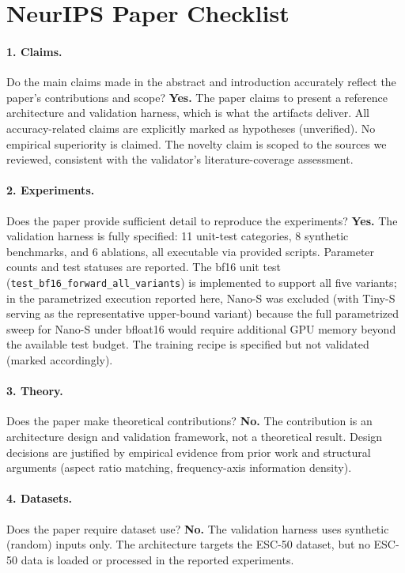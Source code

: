 \documentclass{article}
\begin{document}
\newpage
\section*{NeurIPS Paper Checklist}

\paragraph{1. Claims.}
Do the main claims made in the abstract and introduction accurately reflect the
paper's contributions and scope?
\textbf{Yes.} The paper claims to present a reference architecture and
validation harness, which is what the artifacts deliver. All accuracy-related
claims are explicitly marked as hypotheses (unverified). No empirical
superiority is claimed. The novelty claim is scoped to the sources we reviewed,
consistent with the validator's literature-coverage assessment.

\paragraph{2. Experiments.}
Does the paper provide sufficient detail to reproduce the experiments?
\textbf{Yes.} The validation harness is fully specified: 11 unit-test categories,
8 synthetic benchmarks, and 6 ablations, all executable via provided scripts.
Parameter counts and test statuses are reported. The bf16 unit test
(\texttt{test\_bf16\_forward\_all\_variants}) is implemented to support all five
variants; in the parametrized execution reported here, Nano-S was excluded (with
Tiny-S serving as the representative upper-bound variant) because the full
parametrized sweep for Nano-S under bfloat16 would require additional GPU memory
beyond the available test budget. The training recipe is specified but not
validated (marked accordingly).

\paragraph{3. Theory.}
Does the paper make theoretical contributions?
\textbf{No.} The contribution is an architecture design and validation framework,
not a theoretical result. Design decisions are justified by empirical evidence
from prior work and structural arguments (aspect ratio matching, frequency-axis
information density).

\paragraph{4. Datasets.}
Does the paper require dataset use?
\textbf{No.} The validation harness uses synthetic (random) inputs only. The
architecture targets the ESC-50 dataset, but no ESC-50 data is loaded or
processed in the reported experiments.
\end{document}
